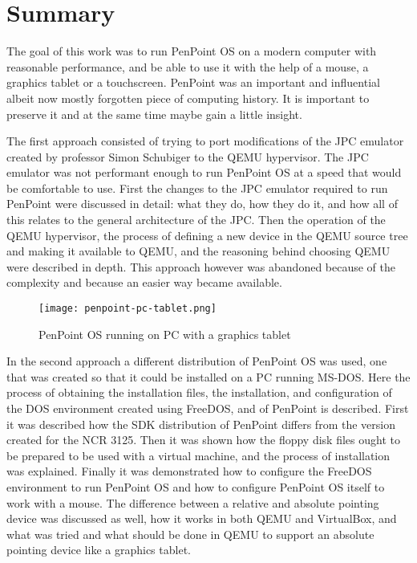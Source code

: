 \clearpage %

\section{Summary}

The goal of this work was to run PenPoint OS on a modern computer with
reasonable performance, and be able to use it with the help of a mouse,
a graphics tablet or a touchscreen. PenPoint was an important and influential
albeit now mostly forgotten piece of computing history. It is important to
preserve it and at the same time maybe gain a little insight.

The first approach consisted of trying to port modifications of the JPC
emulator created by professor Simon Schubiger to the QEMU hypervisor. The JPC
emulator was not performant enough to run PenPoint OS at a speed that would be
comfortable to use. First the changes to the JPC emulator required to run
PenPoint were discussed in detail: what they do, how they do it, and how all of
this relates to the general architecture of the JPC. Then the operation of the
QEMU hypervisor, the process of defining a new device in the QEMU source tree
and making it available to QEMU, and the reasoning behind choosing QEMU were
described in depth. This approach however was abandoned because of the
complexity and because an easier way became available.

\begin{figure}[!h]
    \centering
    \texttt{[image: penpoint-pc-tablet.png]}
    \caption{PenPoint OS running on PC with a graphics tablet}
    \label{fig:penpoint-pc-tablet}
\end{figure}

In the second approach a different distribution of PenPoint OS was used, one
that was created so that it could be installed on a PC running MS-DOS. Here the
process of obtaining the installation files, the installation, and
configuration of the DOS environment created using FreeDOS, and of PenPoint is
described. First it was described how the SDK distribution of PenPoint differs
from the version created for the NCR 3125. Then it was shown how the floppy
disk files ought to be prepared to be used with a virtual machine, and the
process of installation was explained. Finally it was demonstrated how to
configure the FreeDOS environment to run PenPoint OS and how to configure
PenPoint OS itself to work with a mouse. The difference between a relative and
absolute pointing device was discussed as well, how it works in both QEMU and
VirtualBox, and what was tried and what should be done in QEMU to support an
absolute pointing device like a graphics tablet.


